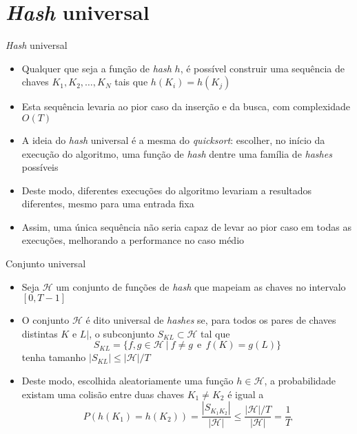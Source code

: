 \section{{\it Hash} universal}

\begin{frame}[fragile]{{\it Hash} universal}

    \begin{itemize}
        \item Qualquer que seja a função de  \textit{hash} $h$, é possível construir uma
            sequência de chaves $K_1, K_2, \ldots, K_N$ tais que $h(K_i) = h(K_j)$

        \item Esta sequência levaria ao pior caso da inserção e da busca, com complexidade
            $O(T)$

        \item A ideia do \textit{hash} universal é a mesma do \textit{quicksort}: escolher,
            no início da execução do algoritmo, uma função de \textit{hash} dentre uma 
            família de \textit{hashes} possíveis

        \item Deste modo, diferentes execuções do algoritmo levariam a resultados diferentes,
            mesmo para uma entrada fixa

        \item Assim, uma única sequência não seria capaz de levar ao pior caso em todas as
            execuções, melhorando a performance no caso médio
             
    \end{itemize}

\end{frame}

\begin{frame}[fragile]{Conjunto universal}

    \begin{itemize}
        \item Seja $\mathcal{H}$ um conjunto de funções de \textit{hash} que mapeiam as chaves
            no intervalo $[0, T -1]$

        \item O conjunto $\mathcal{H}$ é dito universal de \textit{hashes} se, para todos os pares 
            de chaves distintas $K$ e $L|$, o subconjunto $S_{KL}\subset \mathcal{H}$ tal que
            \[
                S_{KL} = \lbrace f, g\in\mathcal{H}\ |\ f\neq g \ \ \mbox{e}\ \ f(K) = g(L)\rbrace
            \]
            tenha tamanho $|S_{KL}| \leq |\mathcal{H}|/T$

        \item Deste modo, escolhida aleatoriamente uma função $h\in\mathcal{H}$, a probabilidade 
            existam uma colisão entre duas chaves $K_1\neq K_2$ é igual a
            \[
                P(h(K_1) = h(K_2)) = \frac{|S_{K_1K_2}|}{|\mathcal{H}|} \leq \frac{|\mathcal{H}|/T}{|\mathcal{H}|} = \frac{1}{T}
            \]

    \end{itemize}

\end{frame}

